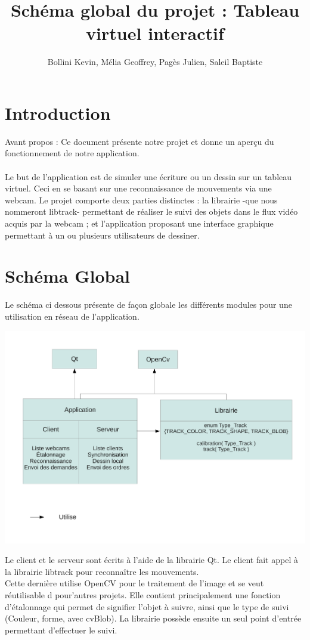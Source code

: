 \documentclass{article}
\title{Schéma global du projet : Tableau virtuel interactif}
\author{Bollini Kevin, Mélia Geoffrey, Pagès Julien, Saleil Baptiste}
\begin{document}
\maketitle

\section{Introduction}
Avant propos : Ce document présente notre projet et donne un aperçu du fonctionnement de notre application.
\paragraph{}
Le but de l’application est de simuler une écriture ou un dessin sur un tableau virtuel. Ceci en se basant sur une
reconnaissance de mouvements via une webcam. Le projet comporte deux parties distinctes : 
la librairie -que nous nommeront libtrack- permettant de réaliser le suivi des objets dans le flux vidéo acquis par la webcam ; et l'application proposant une interface graphique permettant à un ou plusieurs utilisateurs de dessiner.


\section{Schéma Global}
Le schéma ci dessous présente de façon globale les différents modules pour une utilisation en réseau de l'application.
	\begin{center}
	\includegraphics[scale=0.5]{schema_global.pdf}
	\end{center}
Le client et le serveur sont écrits à l'aide de la librairie Qt. Le client fait appel à la librairie libtrack pour reconnaître les mouvements. \\
Cette dernière utilise OpenCV pour le traitement de l'image et se veut réutilisable d pour'autres projets. 
Elle contient principalement une fonction d'étalonnage qui permet de signifier l'objet à suivre, ainsi que le type de suivi (Couleur, forme, avec cvBlob). La librairie possède ensuite un seul point d'entrée permettant d'effectuer le suivi.
\end{document}

